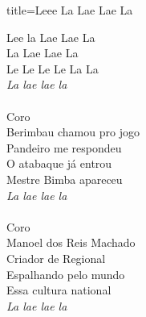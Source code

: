\documentclass[fontsize=14pt, paper=a4, twoside, DIV=20]{scrreprt} %
\begin{document}
\begin{multicols*}{2}
\begin{song}{title={Leee La Lae Lae La}}
        \begin{verse*}
            Lee la Lae Lae La\\
            La Lae Lae La\\
            Le Le Le Le La La\\
            \textit{La lae lae la}\\
\\
            Coro\\
            Berimbau chamou pro jogo\\
            Pandeiro me respondeu\\
            O atabaque já entrou\\
            Mestre Bimba apareceu\\
            \textit{La lae lae la}\\
\\
            Coro\\
            Manoel dos Reis Machado\\
            Criador de Regional\\
            Espalhando pelo mundo\\
            Essa cultura national\\
            \textit{La lae lae la}\\


\end{verse*}
\end{song}
\end{multicols*}
\end{document}
